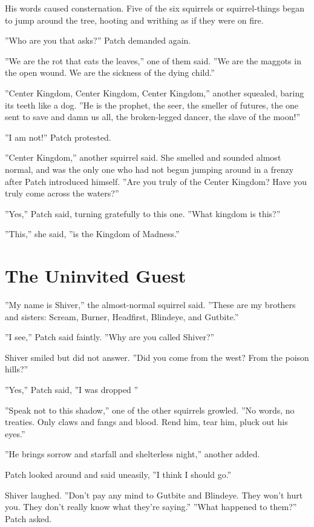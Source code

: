 \documentclass[12pt]{book}
\begin{document}
His words caused consternation. Five of the six squirrels %
or squirrel-things %
began to jump around the tree, hooting and writhing as if they were on fire.

''Who are you that asks?'' Patch demanded again.

''We are the rot that eats the leaves,'' one of them said. ''We are the maggots in the open wound. We are the sickness of the dying child.''

''Center Kingdom, Center Kingdom, Center Kingdom,'' another squealed, baring its teeth like a dog. ''He is the prophet, the seer, the smeller of futures, the one sent to save and damn us all, the broken-legged dancer, the slave of the moon!''

''I am not!'' Patch protested.

''Center Kingdom,'' another squirrel said. She smelled and sounded almost normal, and was the only one who had not begun jumping around in a frenzy after Patch introduced himself. ''Are you truly of the Center Kingdom? Have you truly come across the waters?''

''Yes,'' Patch said, turning gratefully to this one. ''What kingdom is this?''

''This,'' she said, ''is the Kingdom of Madness.''


\section{The Uninvited Guest}

''My name is Shiver,'' the almost-normal squirrel said. ''These are my brothers and sisters: Scream, Burner, Headfirst, Blindeye, and Gutbite.''

''I see,'' Patch said faintly. ''Why are you called Shiver?''

Shiver smiled but did not answer. ''Did you come from the west? From the poison hills?''

''Yes,'' Patch said, ''I was dropped %
''

''Speak not to this shadow,'' one of the other squirrels growled. ''No words, no treaties. Only claws and fangs and blood. Rend him, tear him, pluck out his eyes.''

''He brings sorrow and starfall and shelterless night,'' another added.

Patch looked around and said uneasily, ''I think I should go.''

Shiver laughed. ''Don't pay any mind to Gutbite and Blindeye. They won't hurt you. They don't really know what they're saying.'' ''What happened to them?'' Patch asked.
\end{document}
